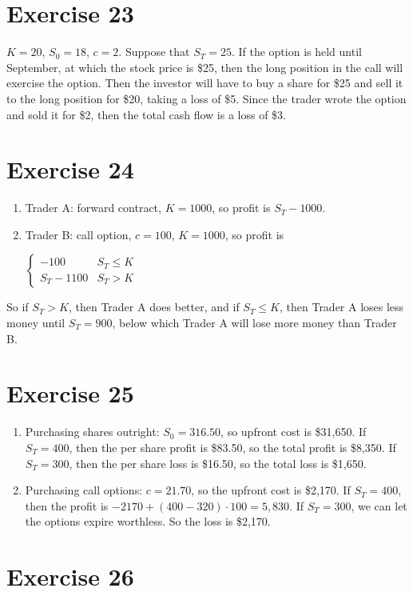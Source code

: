 \documentclass{article}
\begin{document}
\section*{Exercise 23}
$K = 20$, $S_0 = 18$, $c = 2$. Suppose that $S_T = 25$. If the option is held until
September, at which the stock price is \$25, then the long position in the call
will exercise the option. Then the investor will have to buy a share for \$25 and
sell it to the long position for \$20, taking a loss of \$5. Since the trader
wrote the option and sold it for \$2, then the total cash flow is a loss of \$3.

\section*{Exercise 24}
\begin{enumerate}
    \item Trader A: forward contract, $K = 1000$, so profit is $S_T - 1000$.
    \item Trader B: call option, $c = 100$, $K = 1000$, so profit is
    \begin{center}
        $\begin{cases}
            -100 & S_T \leq K \\
            S_T - 1100 & S_T > K
        \end{cases}$
    \end{center}
\end{enumerate}
\begin{flushleft}
    So if $S_T > K$, then Trader A does better, and if $S_T \leq K$, then Trader A loses less money until $S_T = 900$, below which Trader A will lose more money than Trader B.
\end{flushleft}

\section*{Exercise 25}
\begin{enumerate}
    \item Purchasing shares outright: $S_0 = 316.50$, so upfront cost is \$31,650. If $S_T = 400$, then the per share profit is
    \$83.50, so the total profit is \$8,350. If $S_T = 300$, then the per share loss is \$16.50, so the total loss is \$1,650.
    \item Purchasing call options: $c = 21.70$, so the upfront cost is \$2,170. 
    If $S_T = 400$, then the profit is $-2170 + (400 - 320) \cdot 100 = 5,830$.
    If $S_T = 300$, we can let the options expire worthless. So the loss is \$2,170.
\end{enumerate}

\section*{Exercise 26}
\end{document}
